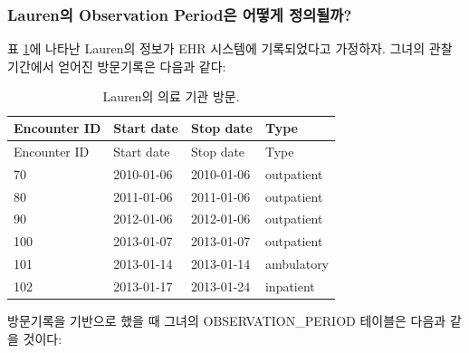 \documentclass[11pt]{book}
\theoremstyle{definition}
\theoremstyle{definition}
\theoremstyle{definition}
\theoremstyle{remark}
\begin{document}
\subsubsection*{Lauren의 Observation Period은 어떻게
정의될까?}\label{lauren-observation-period--}

표 \ref{tab:encounters}에 나타난 Lauren의 정보가 EHR 시스템에
기록되었다고 가정하자. 그녀의 관찰 기간에서 얻어진 방문기록은 다음과
같다:

\begin{longtable}[]{@{}llll@{}}
\caption{\label{tab:encounters} Lauren의 의료 기관 방문.}\tabularnewline
\toprule
Encounter ID & Start date & Stop date & Type\tabularnewline
\midrule
\endfirsthead
\toprule
Encounter ID & Start date & Stop date & Type\tabularnewline
\midrule
\endhead
70 & 2010-01-06 & 2010-01-06 & outpatient\tabularnewline
80 & 2011-01-06 & 2011-01-06 & outpatient\tabularnewline
90 & 2012-01-06 & 2012-01-06 & outpatient\tabularnewline
100 & 2013-01-07 & 2013-01-07 & outpatient\tabularnewline
101 & 2013-01-14 & 2013-01-14 & ambulatory\tabularnewline
102 & 2013-01-17 & 2013-01-24 & inpatient\tabularnewline
\bottomrule
\end{longtable}

방문기록을 기반으로 했을 때 그녀의 OBSERVATION\_PERIOD 테이블은 다음과
같을 것이다:
\end{document}
